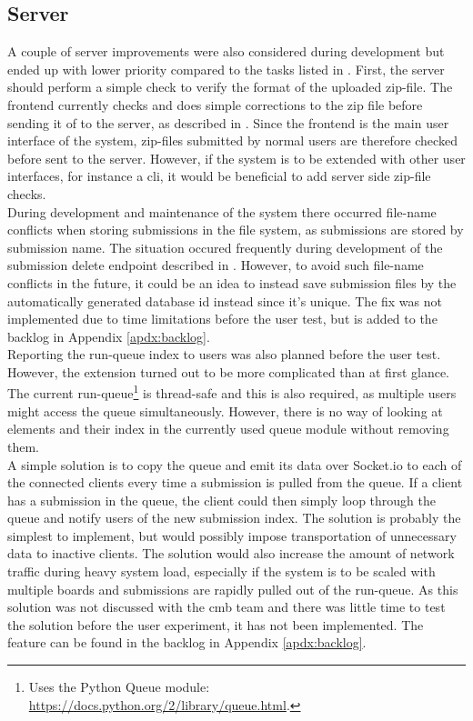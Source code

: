 \subsection{Server}
\label{sec:disc-server}
A couple of server improvements were also considered during development but ended up with lower priority compared to the tasks listed in . First, the server should perform a simple check to verify the format of the uploaded zip-file. The frontend currently checks and does simple corrections to the zip file before sending it of to the server, as described in . Since the frontend is the main user interface of the system, zip-files submitted by normal users are therefore checked before sent to the server. However, if the system is to be extended with other user interfaces, for instance a \gls{cli}, it would be beneficial to add server side zip-file checks. \\

During development and maintenance of the system there occurred file-name conflicts when storing submissions in the file system, as submissions are stored by submission name. The situation occured frequently during development of the submission delete endpoint described in . However, to avoid such file-name conflicts in the future, it could be an idea to instead save submission files by the automatically generated database id instead since it's unique. The fix was not implemented due to time limitations before the user test, but is added to the backlog in Appendix \ref{apdx:backlog}. \\

Reporting the run-queue index to users was also planned before the user test. However, the extension turned out to be more complicated than at first glance. The current run-queue\footnote{Uses the Python Queue module: \url{https://docs.python.org/2/library/queue.html}.} is thread-safe and this is also required, as multiple users might access the queue simultaneously. However, there is no way of looking at elements and their index in the currently used queue module without removing them.  \\

A simple solution is to copy the queue and emit its data over Socket.io to each of the connected clients every time a submission is pulled from the queue. If a client has a submission in the queue, the client could then simply loop through the queue and notify users of the new submission index. The solution is probably the simplest to implement, but would possibly impose transportation of unnecessary data to inactive clients. The solution would also increase the amount of network traffic during heavy system load, especially if the system is to be scaled with multiple boards and submissions are rapidly pulled out of the run-queue. As this solution was not discussed with the \gls{cmb} team and there was little time to test the solution before the user experiment, it has not been implemented. The feature can be found in the backlog in Appendix \ref{apdx:backlog}. \\

